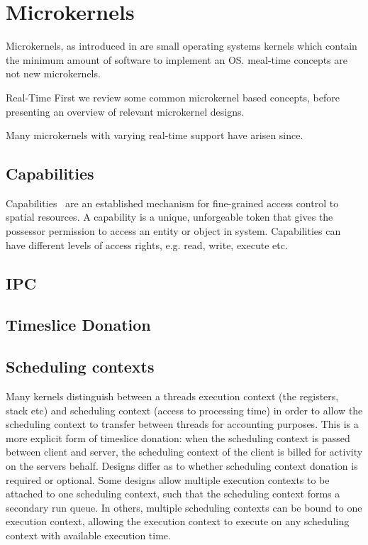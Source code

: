 
\section{Microkernels}

Microkernels, as introduced in  are small operating systems kernels which contain the minimum amount of software to
implement an OS. 
meal-time concepts are not new microkernels.

Real-Time
First we review some common microkernel based concepts, before presenting an overview of relevant microkernel designs.


Many microkernels with varying real-time support have arisen since.


\subsection{Capabilities}

Capabilities~\citep{Dennis_VanHorn_66} are an established mechanism for fine-grained access control
to spatial resources. A capability is a unique, unforgeable token that gives the possessor
permission to access an entity or object in system. Capabilities can have different levels of access
rights, e.g. read, write, execute etc.

\subsection{IPC}


\subsection{Timeslice Donation}




\subsection{Scheduling contexts}

Many kernels distinguish between a threads execution context (the registers, stack etc) and scheduling context (access to processing time) in order to allow the scheduling context to transfer between threads for accounting purposes.
This is a more explicit form of timeslice donation: when the scheduling context is passed between client and server, the scheduling context of the client is billed for activity on the servers behalf. 
Designs differ as to whether scheduling context donation is required or optional. 
Some designs allow multiple execution contexts to be attached to one scheduling context, such that the scheduling context forms a secondary run queue. 
In others, multiple scheduling contexts can be bound to one execution context, allowing the execution context to execute on any scheduling context with available execution time. 

